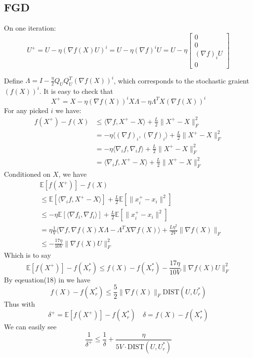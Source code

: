 \documentclass[letterpaper]{article} %
\begin{document}
\subsection{FGD}
On one iteration:
$$U^+=U-\eta (\nabla f(X)U)^i= U-\eta (\nabla f)^iU=U-\eta\begin{bmatrix}
    0 \\
    0 \\
	(\nabla f)_iU\\    
    0 
\end{bmatrix}$$

Define $\Lambda=I-\frac{\eta}{2}Q_UQ_U^T(\nabla f(X))^i$, which corresponds to the stochastic graient $(f(X))^i$. It is easy to check that 
\begin{equation}
X^+=X-\eta(\nabla f(X))^iX\Lambda-\eta\Lambda^TX(\nabla f(X))^i
\end{equation}
For any picked $i$ we have:
\begin{equation}
\begin{split}
f(X^+)-f(X)&\le\langle\nabla f, X^+-X\rangle+\frac{L}{2}\|X^+-X\|_F^2\\
&=-\eta\langle(\nabla f)_i, (\nabla f)_i\rangle+\frac{L}{2}\|X^+-X\|_F^2\\
&=-\eta\langle\nabla_i f, \nabla_i f\rangle+\frac{L}{2}\|X^+-X\|_F^2\\
&=\langle\nabla_i f, X^+-X\rangle+\frac{L}{2}\|X^+-X\|_F^2
\end{split}
\end{equation}
Conditioned on $X$, we have
\begin{equation}
\begin{split}
&\mathbb{E}[f(X^+)]-f(X)\\&\le \mathbb{E}[\langle\nabla_i f, X^+-X \rangle]+\frac{L}{2}\mathbb{E}[\|x_i^+-x_i\|^2] \\
&\le -\eta\mathbb{E}[\langle\nabla f_i, \nabla f_i\rangle]+\frac{L}{2}\mathbb{E}[\|x_i^+-x_i\|^2]\\
&=\eta\frac{1}{V}\langle\nabla f, \nabla f(X)X\Lambda-\Lambda^T X\nabla f(X)\rangle+\frac{L\eta^2}{2V}\|\nabla f(X)\|_F\\
&\le-\frac{17\eta}{10V}\|\nabla f(X)U\|^2_F
\end{split}
\end{equation}
Which is to say
\begin{equation}
 \mathbb{E}[f(X^+)]-f(X_r^*)\le f(X)-f(X_r^*)-\frac{17\eta}{10V}\|\nabla f(X)U\|^2_F
\end{equation}
By eqeuation(18) in \cite{tu2015low} we have 
\begin{equation}
f(X)-f(X_r^*)\le\frac{5}{2}\|\nabla f(X)\|_F\text{DIST}(U,U^*_r)
\end{equation}
Thus with 
$$\delta^+= \mathbb{E}[f(X^+)]-f(X_r^*)\quad \delta=f(X)-f(X_r^*)$$
We can easily see
\begin{equation}
\frac{1}{\delta^+}\le\frac{1}{\delta}+ \frac{\eta}{5V\cdot\text{DIST}(U,U^*_r)}
\end{equation}
\end{document}
